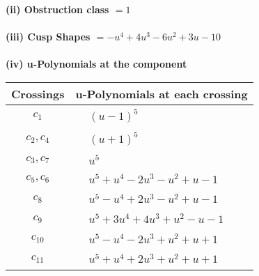 \documentclass[1p]{elsarticle_modified}
\theoremstyle{definition}
\begin{document}
\flushleft \textbf{(ii) Obstruction class $= 1$}\\~\\
\flushleft \textbf{(iii) Cusp Shapes $= - u^4+4 u^3-6 u^2+3 u-10$}\\~\\
\newpage\renewcommand{\arraystretch}{1}
\flushleft \textbf{(iv) u-Polynomials at the component}\newline \\
\begin{tabular}{m{50pt}|m{274pt}}
Crossings & \hspace{64pt}u-Polynomials at each crossing \\
\hline $$\begin{aligned}c_{1}\end{aligned}$$&$\begin{aligned}
&(u-1)^5
\end{aligned}$\\
\hline $$\begin{aligned}c_{2},c_{4}\end{aligned}$$&$\begin{aligned}
&(u+1)^5
\end{aligned}$\\
\hline $$\begin{aligned}c_{3},c_{7}\end{aligned}$$&$\begin{aligned}
&u^5
\end{aligned}$\\
\hline $$\begin{aligned}c_{5},c_{6}\end{aligned}$$&$\begin{aligned}
&u^5+u^4-2 u^3- u^2+u-1
\end{aligned}$\\
\hline $$\begin{aligned}c_{8}\end{aligned}$$&$\begin{aligned}
&u^5- u^4+2 u^3- u^2+u-1
\end{aligned}$\\
\hline $$\begin{aligned}c_{9}\end{aligned}$$&$\begin{aligned}
&u^5+3 u^4+4 u^3+u^2- u-1
\end{aligned}$\\
\hline $$\begin{aligned}c_{10}\end{aligned}$$&$\begin{aligned}
&u^5- u^4-2 u^3+u^2+u+1
\end{aligned}$\\
\hline $$\begin{aligned}c_{11}\end{aligned}$$&$\begin{aligned}
&u^5+u^4+2 u^3+u^2+u+1
\end{aligned}$\\
\hline
\end{tabular}\\~\\
\end{document}
